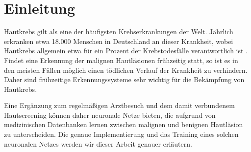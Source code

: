 \section{Einleitung}

Hautkrebs gilt als eine der häufigsten Krebserkrankungen der Welt. Jährlich erkranken etwa 18.000 Menschen in Deutschland an dieser Krankheit, wobei Hautkrebs allgemein etwa für ein Prozent der Krebstodesfälle verantwortlich ist \citep{hautkrebs}. Findet eine Erkennung der malignen Hautläsionen frühzeitig statt, so ist es in den meisten Fällen möglich einen tödlichen Verlauf der Krankheit zu verhindern. Daher sind frühzeitige Erkennungssysteme sehr wichtig für die Bekämpfung von Hautkrebs.

Eine Ergänzung zum regelmäßigen Arztbesuch und dem damit verbundenem Hautscreening können daher neuronale Netze bieten, die aufgrund von medizinischen Datenbanken lernen zwischen malignen und benignen Hautläsion zu unterscheiden. Die genaue Implementierung und das Training eines solchen neuronalen Netzes werden wir dieser Arbeit genauer erläutern. 